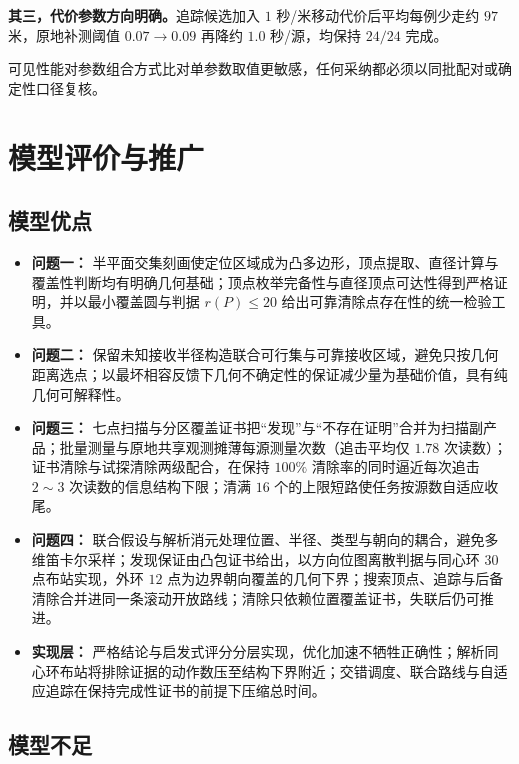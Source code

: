 \documentclass[withoutpreface]{cumcmthesis}
\begin{document}
\textbf{其三，代价参数方向明确。}追踪候选加入 $1$ 秒/米移动代价后平均每例少走约 $97$ 米，原地补测阈值 $0.07\to0.09$ 再降约 $1.0$ 秒/源，均保持 $24/24$ 完成。

可见性能对参数组合方式比对单参数取值更敏感，任何采纳都必须以同批配对或确定性口径复核。

\section{模型评价与推广}

\subsection{模型优点}

\begin{itemize}
\item \textbf{问题一：} 半平面交集刻画使定位区域成为凸多边形，顶点提取、直径计算与覆盖性判断均有明确几何基础；顶点枚举完备性与直径顶点可达性得到严格证明，并以最小覆盖圆与判据 $r(P)\leq20$ 给出可靠清除点存在性的统一检验工具。
\item \textbf{问题二：} 保留未知接收半径构造联合可行集与可靠接收区域，避免只按几何距离选点；以最坏相容反馈下几何不确定性的保证减少量为基础价值，具有纯几何可解释性。
\item \textbf{问题三：} 七点扫描与分区覆盖证书把“发现”与“不存在证明”合并为扫描副产品；批量测量与原地共享观测摊薄每源测量次数（追击平均仅 $1.78$ 次读数）；证书清除与试探清除两级配合，在保持 $100\%$ 清除率的同时逼近每次追击 $2\sim3$ 次读数的信息结构下限；清满 $16$ 个的上限短路使任务按源数自适应收尾。
\item \textbf{问题四：} 联合假设与解析消元处理位置、半径、类型与朝向的耦合，避免多维笛卡尔采样；发现保证由凸包证书给出，以方向位图离散判据与同心环 $30$ 点布站实现，外环 $12$ 点为边界朝向覆盖的几何下界；搜索顶点、追踪与后备清除合并进同一条滚动开放路线；清除只依赖位置覆盖证书，失联后仍可推进。
\item \textbf{实现层：} 严格结论与启发式评分分层实现，优化加速不牺牲正确性；解析同心环布站将排除证据的动作数压至结构下界附近；交错调度、联合路线与自适应追踪在保持完成性证书的前提下压缩总时间。
\end{itemize}

\subsection{模型不足}
\end{document}
